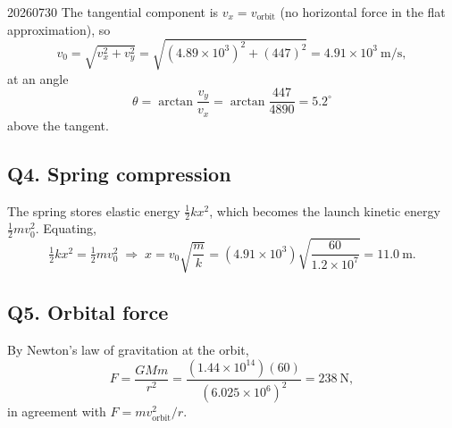 \begin{solution}{20260730}
The tangential component is $v_{x} = v_{\text{orbit}}$ (no horizontal force in the flat approximation), so
\[
  v_0 = \sqrt{v_{x}^{2} + v_{y}^{2}}
      = \sqrt{(4.89\times10^{3})^{2} + (447)^{2}}
      = \boxed{4.91\times10^{3}\ \mathrm{m/s}},
\]
at an angle
\[
  \theta = \arctan\frac{v_{y}}{v_{x}}
         = \arctan\frac{447}{4890}
         = \boxed{5.2^{\circ}}
\]
above the tangent.

\subsection*{Q4. Spring compression}

The spring stores elastic energy $\tfrac12 k x^{2}$, which becomes the launch kinetic energy $\tfrac12 m v_0^{2}$.  Equating,
\[
  \tfrac12 k x^{2} = \tfrac12 m v_0^{2}
  \;\Longrightarrow\;
  x = v_0\sqrt{\frac{m}{k}}
    = (4.91\times10^{3})\sqrt{\frac{60}{1.2\times10^{7}}}
    = \boxed{11.0\ \mathrm{m}}.
\]

\subsection*{Q5. Orbital force}

By Newton's law of gravitation at the orbit,
\[
  F = \frac{G M m}{r^{2}}
    = \frac{(1.44\times10^{14})(60)}{(6.025\times10^{6})^{2}}
    = \boxed{238\ \mathrm{N}},
\]
in agreement with $F = m v_{\text{orbit}}^{2}/r$.

\end{solution}


